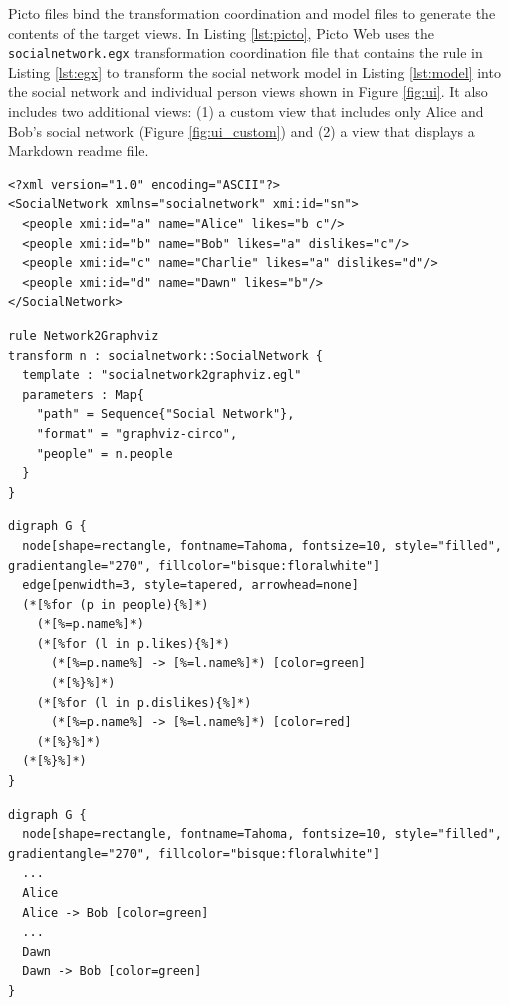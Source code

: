 \documentclass[preprint,12pt, a4paper]{elsarticle}
\begin{document}
Picto files bind the transformation coordination and model files to generate the contents of the target views. In Listing \ref{lst:picto}, Picto Web uses the \texttt{socialnetwork.egx} transformation coordination file that contains the rule in Listing \ref{lst:egx} to transform the social network model in Listing \ref{lst:model} into the social network and individual person views shown in Figure \ref{fig:ui}. It also includes two additional views: (1) a custom view that includes only Alice and Bob's social network (Figure \ref{fig:ui_custom}) and (2) a view that displays a Markdown readme file.
\begin{lstlisting}[firstnumber=1,style=model,caption={A social network model as the input file for the lazy transformation. The format of the ids is simplified.},label=lst:model,float]
<?xml version="1.0" encoding="ASCII"?>
<SocialNetwork xmlns="socialnetwork" xmi:id="sn">
  <people xmi:id="a" name="Alice" likes="b c"/>
  <people xmi:id="b" name="Bob" likes="a" dislikes="c"/>
  <people xmi:id="c" name="Charlie" likes="a" dislikes="d"/>
  <people xmi:id="d" name="Dawn" likes="b"/>
</SocialNetwork>
\end{lstlisting}
\begin{lstlisting}[firstnumber=1,style=egx,caption={The Network2Graphviz EGX rule},label=lst:egx,float]
rule Network2Graphviz 
transform n : socialnetwork::SocialNetwork {
  template : "socialnetwork2graphviz.egl"
  parameters : Map{
    "path" = Sequence{"Social Network"},
    "format" = "graphviz-circo",
    "people" = n.people
  }
}
\end{lstlisting}
\begin{lstlisting}[firstnumber=1,style=egx,caption={An EGL template that generates a Graphviz representation of a social network.},label=lst:egl,float]
digraph G {
  node[shape=rectangle, fontname=Tahoma, fontsize=10, style="filled", gradientangle="270", fillcolor="bisque:floralwhite"]
  edge[penwidth=3, style=tapered, arrowhead=none]
  (*[%for (p in people){%]*)
    (*[%=p.name%]*)
    (*[%for (l in p.likes){%]*)
      (*[%=p.name%] -> [%=l.name%]*) [color=green]
      (*[%}%]*)
    (*[%for (l in p.dislikes){%]*)
      (*[%=p.name%] -> [%=l.name%]*) [color=red]
    (*[%}%]*)
  (*[%}%]*)
}
\end{lstlisting}
\begin{lstlisting}[firstnumber=1,style=egx,caption={A view generated by the EGL template in Listing \ref{lst:egl}.},label=lst:output,float]
digraph G {
  node[shape=rectangle, fontname=Tahoma, fontsize=10, style="filled", gradientangle="270", fillcolor="bisque:floralwhite"]
  ...
  Alice
  Alice -> Bob [color=green]
  ...
  Dawn
  Dawn -> Bob [color=green] 
}
\end{lstlisting}
\end{document}
